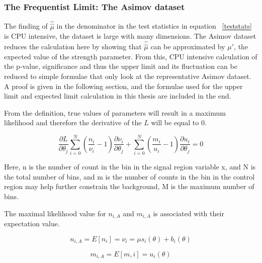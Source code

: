 


\subsubsection{The Frequentist Limit: The Asimov dataset}
\label{sec:asimov}

The finding of $\hat{\hat{\mu}}$ in the denominator in the test statistics in equation ~\ref{teststats} is CPU intensive, the dataset is large with many dimensions. The Asimov dataset reduces the calculation here by showing that $\hat{\hat{\mu}}$ can be approximated by $\mu'$, the expected value of the strength parameter. From this, CPU intensive calculation of the p-value, significance and thus the upper limit and its fluctuation can be reduced to simple formulae that only look at the representative Asimov dataset. 
A proof is given in the following section, and the formulae used for the upper limit and expected limit calculation in this thesis are included in the end. 

From the definition, true values of parameters will result in a maximum likelihood and therefore the derivative of the ${L}$ will be equal to 0. 

\begin{equation}
\frac{\partial{L}}{\partial{\theta_{j}}} \sum_{i=0}^{N}(\frac{n_{i}}{\nu_{i}}-1) \frac{\partial{\nu_{i}}}{\partial{\theta_{j}}}+ \sum_{i=0}^{N}(\frac{m_{i}}{u_{i}}-1) \frac{\partial{u_{i}}}{\partial{\theta_{j}}} =  0 
\end{equation}

Here, n is the number of count in the bin in the signal region variable x, and N is the total number of bins, and m is the number of counts in the bin in the control region may help further constrain the background, M is the maximum number of bins. 

The maximal likelihood value for $n_{i,A}$ and $m_{i,A}$ is associated with their expectation value. 

\begin{equation}
    n_{i,A} = E[n_{i}] = \nu_{i} = \mu s_{i}(\theta) + b_{i}(\theta)
\end{equation}

\begin{equation}
    m_{i,A} = E[m,i] = u_{i}(\theta)
\end{equation}


